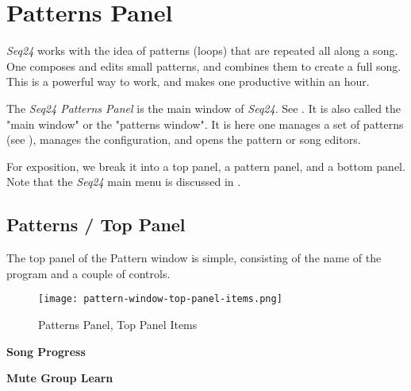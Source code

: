 %
%
%

\section{Patterns Panel}
\label{sec:seq24_patterns_panel}

   \textsl{Seq24} works with the idea of patterns (loops) that are repeated
   all along a song.  One composes and edits small patterns, and combines
   them to create a full song.  This is a powerful way to work, and makes
   one productive within an hour.

   The \textsl{Seq24 Patterns Panel} is the main window of \textsl{Seq24}.
   See .
   It is also called the "main window" or the "patterns window".
   It is here one manages a set of patterns
   (see ),
   manages the configuration, and opens the pattern or song editors.

   For exposition, we break it into a top panel, a pattern panel, and a
   bottom panel.  Note that the \textsl{Seq24} main menu is discussed in
   .

\subsection{Patterns / Top Panel}
\label{subsec:seq24_patterns_panel_top}

   The top panel of the Pattern window is simple, consisting of the name of
   the program and a couple of controls.

\begin{figure}[H]
   \centering 
   \texttt{[image: pattern-window-top-panel-items.png]}
   \caption{Patterns Panel, Top Panel Items}
   \label{fig:pattern_window_top_panel_items}
\end{figure}

   \begin{enumber}
      \item \textbf{Song Progress}
      \item \textbf{Mute Group Learn}
   \end{enumber}

